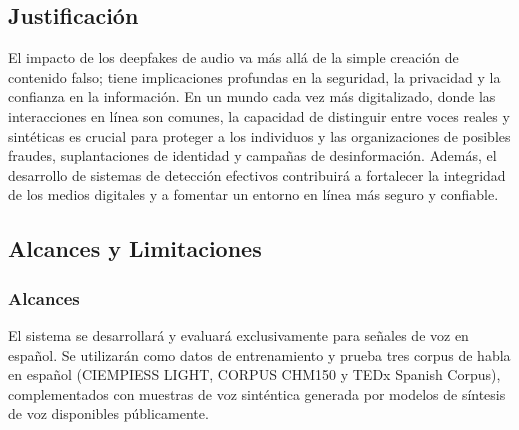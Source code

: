 \subsection{Justificación}
\label{sec:justificacion}

El impacto de los deepfakes de audio va más allá de la simple creación de contenido falso; tiene implicaciones profundas en la seguridad, la privacidad y la confianza en la información. En un mundo cada vez más digitalizado, donde las interacciones en línea son comunes, la capacidad de distinguir entre voces reales y sintéticas es crucial para proteger a los individuos y las organizaciones de posibles fraudes, suplantaciones de identidad y campañas de desinformación. Además, el desarrollo de sistemas de detección efectivos contribuirá a fortalecer la integridad de los medios digitales y a fomentar un entorno en línea más seguro y confiable.


\subsection{Alcances y Limitaciones}
\label{sec:alcances_limitaciones}

\subsubsection{Alcances}
\label{subsec:alcances}

El sistema se desarrollará y evaluará exclusivamente para señales de voz en español. Se utilizarán como datos de entrenamiento y prueba tres corpus de habla en español (CIEMPIESS LIGHT, CORPUS CHM150 y TEDx Spanish Corpus), complementados con muestras de voz sinténtica generada por modelos de síntesis de voz disponibles públicamente. 

